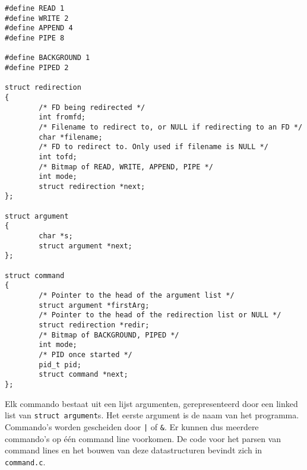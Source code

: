 \documentclass[11pt]{article}
\begin{document}
\begin{verbatim}
#define READ 1
#define WRITE 2
#define APPEND 4
#define PIPE 8

#define BACKGROUND 1
#define PIPED 2

struct redirection
{
        /* FD being redirected */
        int fromfd;
        /* Filename to redirect to, or NULL if redirecting to an FD */
        char *filename;
        /* FD to redirect to. Only used if filename is NULL */
        int tofd;
        /* Bitmap of READ, WRITE, APPEND, PIPE */
        int mode;
        struct redirection *next;
};

struct argument
{
        char *s;
        struct argument *next;
};

struct command
{
        /* Pointer to the head of the argument list */
        struct argument *firstArg;
        /* Pointer to the head of the redirection list or NULL */
        struct redirection *redir;
        /* Bitmap of BACKGROUND, PIPED */
        int mode;
        /* PID once started */
        pid_t pid;
        struct command *next;
};
\end{verbatim}

Elk commando bestaat uit een lijst argumenten, gerepresenteerd door een linked list van \verb+struct argument+s.
Het eerste argument is de naam van het programma. Commando's worden gescheiden door \verb+|+ of \verb+&+. Er
kunnen dus meerdere commando's op \'e\'en command line voorkomen. De code voor het parsen van command lines en
het bouwen van deze datastructuren bevindt zich in \verb+command.c+.
\end{document}
